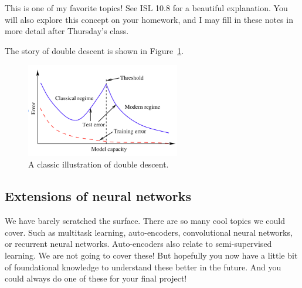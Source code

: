 This is one of my favorite topics! See ISL 10.8 for a beautiful explanation. You will also explore this concept on your homework, and I may fill in these notes in more detail after Thursday's class. 

The story of double descent is shown in Figure~\ref{fig_dd}. 

\begin{figure}
\centering 
\includegraphics[width=0.6\textwidth]{442_lecs/dd.png}
\caption{A classic illustration of double descent.}	
\label{fig_dd}
\end{figure}





\subsection{Extensions of neural networks}

We have barely scratched the surface. There are so many cool topics we could cover. Such as multitask learning, auto-encoders, convolutional neural networks, or recurrent neural networks. Auto-encoders also relate to semi-supervised learning. We are not going to cover these! But hopefully you now have a little bit of foundational knowledge to understand these better in the future. And you could always do one of these for your final project!




